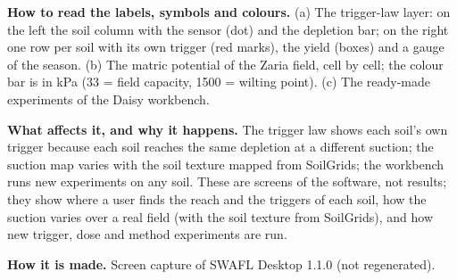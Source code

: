 \textbf{How to read the labels, symbols and colours.} (a) The trigger-law layer: on the left the soil column with the sensor (dot) and the depletion bar; on the right one row per soil with its own trigger (red marks), the yield (boxes) and a gauge of the season. (b) The matric potential of the Zaria field, cell by cell; the colour bar is in kPa (33 = field capacity, 1500 = wilting point). (c) The ready-made experiments of the Daisy workbench.

\textbf{What affects it, and why it happens.} The trigger law shows each soil's own trigger because each soil reaches the same depletion at a different suction; the suction map varies with the soil texture mapped from SoilGrids; the workbench runs new experiments on any soil. These are screens of the software, not results; they show where a user finds the reach and the triggers of each soil, how the suction varies over a real field (with the soil texture from SoilGrids), and how new trigger, dose and method experiments are run.

\textbf{How it is made.} Screen capture of SWAFL Desktop 1.1.0 (not regenerated).
